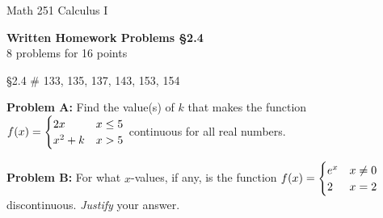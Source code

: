 \documentclass[11pt]{report}
\theoremstyle{plain}
\begin{document}
\hfill Math 251 Calculus I
\begin{center}
\Large{\textbf{Written Homework Problems \S 2.4}} \\
8 problems for 16 points\\
\end{center}

\begin{description}
\item{\S 2.4} \# 133, 135, 137, 143, 153, 154
\item{\textbf{Problem A:}} Find the value(s) of $k$ that makes the function $f(x)= \begin{cases} 2x & x \leq 5 \cr x^2+k &x>5 \end{cases}$ continuous for all real numbers.

\item{\textbf{Problem B:}} For what $x$-values, if any, is the function $f(x)= \begin{cases} e^x & x \not = 0 \cr 2 &x=2 \end{cases}$ discontinuous. \emph{Justify} your answer.
\end{description}
\end{document}
